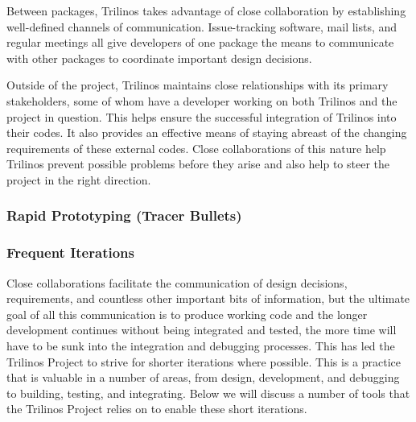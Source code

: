\documentclass[12pt,relax]{article}
\begin{document}
  Between packages, Trilinos takes advantage of close collaboration by 
  establishing well-defined channels of communication.  Issue-tracking
  software, mail lists, and regular meetings all give developers of one package
  the means to communicate with other packages to coordinate important design
  decisions.
  
  Outside of the project, Trilinos maintains close relationships with its primary
  stakeholders, some of whom have a developer working on both Trilinos and the
  project in question.  This helps ensure the successful integration of Trilinos
  into their codes.  It also provides an effective means of staying abreast of
  the changing requirements of these external codes.  Close collaborations of
  this nature help Trilinos prevent possible problems before they arise and also
  help to steer the project in the right direction.
  
  \subsubsection{Rapid Prototyping (Tracer Bullets)}
  
  \subsubsection{Frequent Iterations}
  
  Close collaborations facilitate the communication of design decisions, 
  requirements, and countless other important bits of information, but the
  ultimate goal of all this communication is to produce working code and the
  longer development continues without being integrated and tested, the more
  time will have to be sunk into the integration and debugging processes.  This
  has led the Trilinos Project to strive for shorter iterations where possible.
  This is a practice that is valuable in a number of areas, from design,
  development, and debugging to building, testing, and integrating.  Below we
  will discuss a number of tools that the Trilinos Project relies on to enable
  these short iterations.
  
\end{document}
